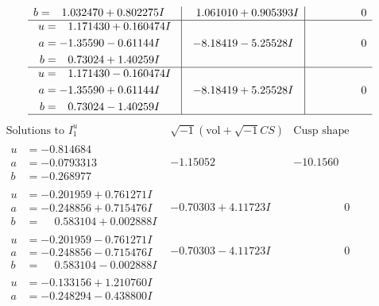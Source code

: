 \documentclass[1p]{elsarticle_modified}
\theoremstyle{definition}
\newcommand{\I}{\sqrt{-1}}
\begin{document}
$$\begin{array}{c|c|c}
\begin{aligned}
b &= \phantom{-}1.032470 + 0.802275 I\end{aligned}
 & \phantom{-}1.061010 + 0.905393 I & \phantom{-0.000000 } 0 \\ \hline\begin{aligned}
u &= \phantom{-}1.171430 + 0.160474 I \\
a &= -1.35590 - 0.61144 I \\
b &= \phantom{-}0.73024 + 1.40259 I\end{aligned}
 & -8.18419 - 5.25528 I & \phantom{-0.000000 } 0 \\ \hline\begin{aligned}
u &= \phantom{-}1.171430 - 0.160474 I \\
a &= -1.35590 + 0.61144 I \\
b &= \phantom{-}0.73024 - 1.40259 I\end{aligned}
 & -8.18419 + 5.25528 I & \phantom{-0.000000 } 0\\
 \hline 
 \end{array}$$\newpage$$\begin{array}{c|c|c}  
\text{Solutions to }I^u_{1}& \I (\text{vol} + \sqrt{-1}CS) & \text{Cusp shape}\\
 \hline 
\begin{aligned}
u &= -0.814684\phantom{ +0.000000I} \\
a &= -0.0793313\phantom{ +0.000000I} \\
b &= -0.268977\phantom{ +0.000000I}\end{aligned}
 & -1.15052\phantom{ +0.000000I} & -10.1560\phantom{ +0.000000I} \\ \hline\begin{aligned}
u &= -0.201959 + 0.761271 I \\
a &= -0.248856 + 0.715476 I \\
b &= \phantom{-}0.583104 + 0.002888 I\end{aligned}
 & -0.70303 + 4.11723 I & \phantom{-0.000000 } 0 \\ \hline\begin{aligned}
u &= -0.201959 - 0.761271 I \\
a &= -0.248856 - 0.715476 I \\
b &= \phantom{-}0.583104 - 0.002888 I\end{aligned}
 & -0.70303 - 4.11723 I & \phantom{-0.000000 } 0 \\ \hline\begin{aligned}
u &= -0.133156 + 1.210760 I \\
a &= -0.248294 - 0.438800 I \\

\end{aligned}
\end{array}$$
\end{document}
